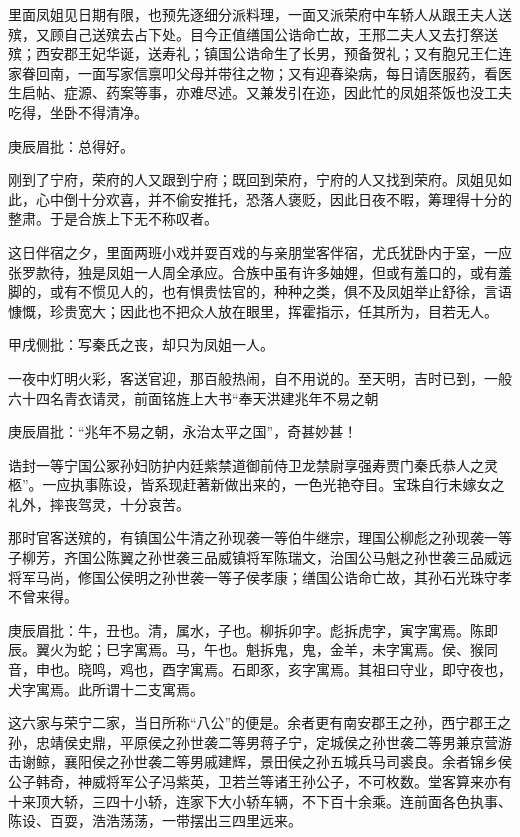 \begin{parag}
    里面凤姐见日期有限，也预先逐细分派料理，一面又派荣府中车轿人从跟王夫人送殡，又顾自己送殡去占下处。目今正值缮国公诰命亡故，王邢二夫人又去打祭送殡；西安郡王妃华诞，送寿礼；镇国公诰命生了长男，预备贺礼；又有胞兄王仁连家眷回南，一面写家信禀叩父母并带往之物；又有迎春染病，每日请医服药，看医生启帖、症源、药案等事，亦难尽述。又兼发引在迩，因此忙的凤姐茶饭也没工夫吃得，坐卧不得清净。\begin{note}庚辰眉批：总得好。\end{note}刚到了宁府，荣府的人又跟到宁府；既回到荣府，宁府的人又找到荣府。凤姐见如此，心中倒十分欢喜，并不偷安推托，恐落人褒贬，因此日夜不暇，筹理得十分的整肃。于是合族上下无不称叹者。
\end{parag}


\begin{parag}
    这日伴宿之夕，里面两班小戏并耍百戏的与亲朋堂客伴宿，尤氏犹卧内于室，一应张罗款待，独是凤姐一人周全承应。合族中虽有许多妯娌，但或有羞口的，或有羞脚的，或有不惯见人的，也有惧贵怯官的，种种之类，俱不及凤姐举止舒徐，言语慷慨，珍贵宽大；因此也不把众人放在眼里，挥霍指示，任其所为，目若无人。\begin{note}甲戌侧批：写秦氏之丧，却只为凤姐一人。\end{note}一夜中灯明火彩，客送官迎，那百般热闹，自不用说的。至天明，吉时已到，一般六十四名青衣请灵，前面铭旌上大书“奉天洪建兆年不易之朝\begin{note}庚辰眉批：“兆年不易之朝，永治太平之国”，奇甚妙甚！\end{note}诰封一等宁国公冢孙妇防护内廷紫禁道御前侍卫龙禁尉享强寿贾门秦氏恭人之灵柩”。一应执事陈设，皆系现赶著新做出来的，一色光艳夺目。宝珠自行未嫁女之礼外，摔丧驾灵，十分哀苦。
\end{parag}


\begin{parag}
    那时官客送殡的，有镇国公牛清之孙现袭一等伯牛继宗，理国公柳彪之孙现袭一等子柳芳，齐国公陈翼之孙世袭三品威镇将军陈瑞文，治国公马魁之孙世袭三品威远将军马尚，修国公侯明之孙世袭一等子侯孝康；缮国公诰命亡故，其孙石光珠守孝不曾来得。\begin{note}庚辰眉批：牛，丑也。清，属水，子也。柳拆卯字。彪拆虎字，寅字寓焉。陈即辰。翼火为蛇；巳字寓焉。马，午也。魁拆鬼，鬼，金羊，未字寓焉。侯、猴同音，申也。晓鸣，鸡也，酉字寓焉。石即豕，亥字寓焉。其祖曰守业，即守夜也，犬字寓焉。此所谓十二支寓焉。\end{note}这六家与荣宁二家，当日所称“八公”的便是。余者更有南安郡王之孙，西宁郡王之孙，忠靖侯史鼎，平原侯之孙世袭二等男蒋子宁，定城侯之孙世袭二等男兼京营游击谢鲸，襄阳侯之孙世袭二等男戚建辉，景田侯之孙五城兵马司裘良。余者锦乡侯公子韩奇，神威将军公子冯紫英，卫若兰等诸王孙公子，不可枚数。堂客算来亦有十来顶大轿，三四十小轿，连家下大小轿车辆，不下百十余乘。连前面各色执事、陈设、百耍，浩浩荡荡，一带摆出三四里远来。
\end{parag}


